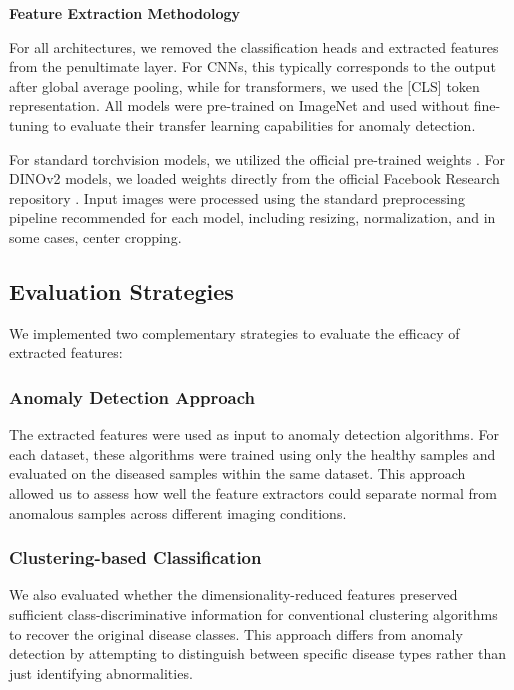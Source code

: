 \documentclass[12pt,a4paper,oneside]{report}
\begin{document}
\textbf{Feature Extraction Methodology}

For all architectures, we removed the classification heads and extracted features from the penultimate layer. For CNNs, this typically corresponds to the output after global average pooling, while for transformers, we used the [CLS] token representation. All models were pre-trained on ImageNet and used without fine-tuning to evaluate their transfer learning capabilities for anomaly detection.

For standard torchvision models, we utilized the official pre-trained weights \cite{ModelsPretrainedWeights}. For DINOv2 models, we loaded weights directly from the official Facebook Research repository \cite{FacebookresearchDinov22025}. Input images were processed using the standard preprocessing pipeline recommended for each model, including resizing, normalization, and in some cases, center cropping.

\subsection{Evaluation Strategies}

We implemented two complementary strategies to evaluate the efficacy of extracted features:

\subsubsection{Anomaly Detection Approach}

The extracted features were used as input to anomaly detection algorithms. For each dataset, these algorithms were trained using only the healthy samples and evaluated on the diseased samples within the same dataset. This approach allowed us to assess how well the feature extractors could separate normal from anomalous samples across different imaging conditions.

\subsubsection{Clustering-based Classification}

We also evaluated whether the dimensionality-reduced features preserved sufficient class-discriminative information for conventional clustering algorithms to recover the original disease classes. This approach differs from anomaly detection by attempting to distinguish between specific disease types rather than just identifying abnormalities.
\end{document}
